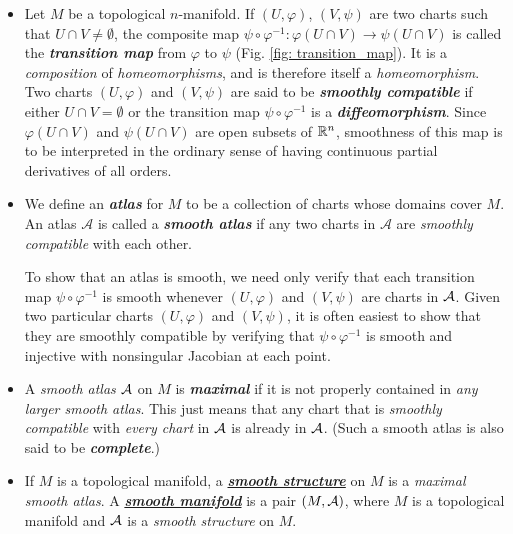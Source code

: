 \documentclass[11pt]{article}
\begin{document}
\begin{itemize}
\item \begin{definition}
Let $M$ be a topological $n$-manifold. If $(U, \varphi)$, $(V, \psi)$ are two charts such that $U \cap V \neq \emptyset$, the composite map $\psi \circ \varphi^{-1}: \varphi(U \cap V ) \rightarrow \psi(U \cap V)$ is called the \emph{\textbf{transition map}} from $\varphi$ to $\psi$ (Fig. \ref{fig: transition_map}). It is a \emph{composition} of \emph{homeomorphisms}, and is therefore itself a \emph{homeomorphism}. Two charts $(U, \varphi)$ and $(V, \psi)$ are said to be \emph{\textbf{smoothly compatible}} if either $U \cap V = \emptyset$ or the transition map $\psi \circ \varphi^{-1}$ is a \emph{\textbf{diffeomorphism}}. Since $\varphi(U \cap V )$ and $\psi(U \cap V ) $ are open subsets of ${\mathbb R}^n$, smoothness of this map is to be interpreted in the ordinary sense of having continuous partial derivatives of all orders.
\end{definition}

\item \begin{definition}
We define an \emph{\textbf{atlas}} for $M$ to be a collection of charts whose domains cover $M$. An atlas $\mathcal{A}$ is called a \emph{\textbf{smooth atlas}} if any two charts in $\mathcal{A}$ are \emph{smoothly compatible} with each other.
\end{definition}

To show that an atlas is smooth, we need only verify that each transition map $\psi \circ \varphi^{-1}$ is smooth whenever $(U, \varphi)$ and $(V, \psi)$ are charts in ${\mathcal A}$. Given two particular charts $(U, \varphi)$ and $(V, \psi)$, it is often easiest to show that they are smoothly compatible by verifying that $\psi \circ \varphi^{-1}$ is smooth and injective with nonsingular Jacobian at each point.

\item \begin{definition}
A \emph{smooth atlas} ${\mathcal A}$ on $M$ is \emph{\textbf{maximal}} if it is not properly contained in \emph{any larger smooth atlas}. This just means that any chart that is \emph{smoothly compatible} with \emph{every chart} in ${\mathcal A}$ is already in ${\mathcal A}$. (Such a smooth atlas is also said to be \emph{\textbf{complete}}.)
\end{definition}

\item 
\begin{definition}
If $M$ is a topological manifold, a \underline{\emph{\textbf{smooth structure}}} on $M$ is a \emph{maximal smooth atlas}. A \underline{\emph{\textbf{smooth manifold}}} is a pair $(M, {\mathcal A})$, where $M$ is a topological manifold and ${\mathcal A}$ is a \emph{smooth structure} on $M$.


\end{definition}
\end{itemize}
\end{document}
